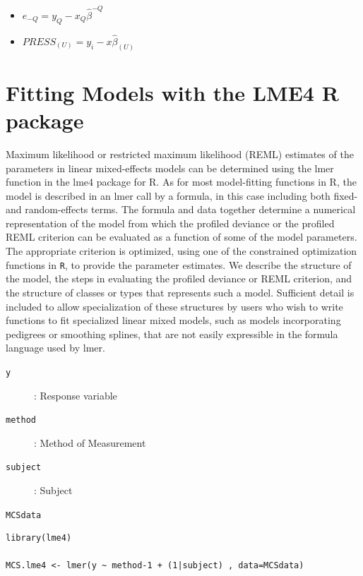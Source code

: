 \documentclass[Main.tex]{subfiles}
\begin{document}
	
	\begin{itemize}
		\item $e_{-Q} = y_{Q} - x_{Q}\hat{\beta}^{-Q}$
		\item $PRESS_{(U)} = y_{i} - x\hat{\beta}_{(U)}$
	\end{itemize}
	
	
\section{Fitting Models with the LME4 R package}
Maximum likelihood or restricted maximum likelihood (REML) estimates of the parameters in linear mixed-effects models can be determined using the lmer function in the lme4 package for R. As for most model-fitting functions in R, the model is described in an lmer call by a formula, in this case including both fixed- and random-effects terms. The formula and data together determine a numerical representation of the model from which the profiled deviance or the profiled REML criterion can be evaluated as a function of some of the model parameters. The appropriate criterion is optimized, using one of the constrained optimization functions in \texttt{R}, to provide the parameter estimates. We describe the structure of the model, the steps in evaluating the profiled deviance or REML criterion, and the structure of classes or types that represents such a model. Sufficient detail is included to allow specialization of these structures by users who wish to write functions to fit specialized linear mixed models, such as models incorporating pedigrees or smoothing splines, that are not easily expressible in the formula language used by lmer.


\begin{description}
	\item[\texttt{y}] : Response variable
	\item[\texttt{method}] : Method of Measurement
	\item[\texttt{subject}] : Subject
	\item[\texttt{MCSdata}] 
\end{description}
\begin{framed}
\begin{verbatim}
library(lme4)

MCS.lme4 <- lmer(y ~ method-1 + (1|subject) , data=MCSdata)
\end{verbatim}
\end{framed}
\end{document}
